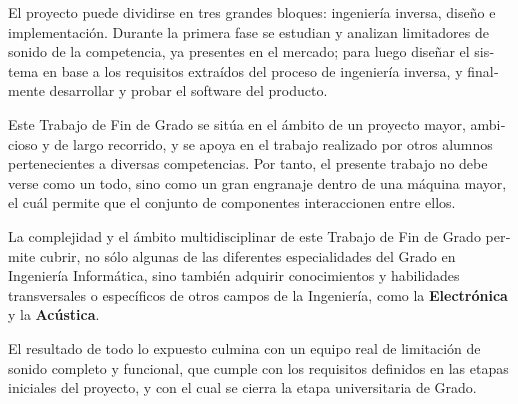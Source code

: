\begin{otherlanguage}{english}
\begin{singlespace}
    \noindent El proyecto puede dividirse en tres grandes bloques: ingeniería inversa, diseño e implementación. Durante la primera fase se estudian y analizan limitadores de sonido de la competencia, ya presentes en el mercado; para luego diseñar el sistema en base a los requisitos extraídos del proceso de ingeniería inversa, y finalmente desarrollar y probar el software del producto.

    \noindent Este Trabajo de Fin de Grado se sitúa en el ámbito de un proyecto mayor, ambicioso y de largo recorrido, y se apoya en el trabajo realizado por otros alumnos pertenecientes a diversas competencias. Por tanto, el presente trabajo no debe verse como un todo, sino como un gran engranaje dentro de una máquina mayor, el cuál permite que el conjunto de componentes interaccionen entre ellos.

    \noindent La complejidad y el ámbito multidisciplinar de este Trabajo de Fin de Grado permite cubrir, no sólo algunas de las diferentes especialidades del Grado en Ingeniería Informática, sino también adquirir conocimientos y habilidades transversales o específicos de otros campos de la Ingeniería, como la \textbf{Electrónica} y la \textbf{Acústica}.

    \noindent El resultado de todo lo expuesto culmina con un equipo real de limitación de sonido completo y funcional, que cumple con los requisitos definidos en las etapas iniciales del proyecto, y con el cual se cierra la etapa universitaria de Grado.



\end{singlespace}
\end{otherlanguage}
